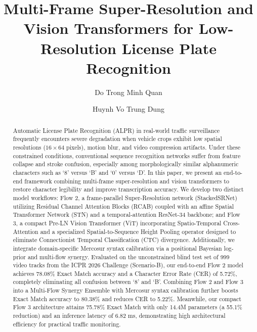 \documentclass[sigconf]{acmart}
\begin{document}
\title{Multi-Frame Super-Resolution and Vision Transformers for Low-Resolution License Plate Recognition}

\author{Do Trong Minh Quan}

\author{Huynh Vo Trung Dung}

\renewcommand{\shortauthors}{Quan and Dung}

\begin{abstract}
Automatic License Plate Recognition (ALPR) in real-world traffic surveillance frequently encounters severe degradation when vehicle crops exhibit low spatial resolutions ($16 \times 64$ pixels), motion blur, and video compression artifacts. Under these constrained conditions, conventional sequence recognition networks suffer from feature collapse and stroke confusion, especially among morphologically similar alphanumeric characters such as `8' versus `B' and `0' versus `D'. In this paper, we present an end-to-end framework combining multi-frame super-resolution and vision transformers to restore character legibility and improve transcription accuracy. We develop two distinct model workflows: Flow 2, a frame-parallel Super-Resolution network (StackedSRNet) utilizing Residual Channel Attention Blocks (RCAB) coupled with an affine Spatial Transformer Network (STN) and a temporal-attention ResNet-34 backbone; and Flow 3, a compact Pre-LN Vision Transformer (ViT) incorporating Spatio-Temporal Cross-Attention and a specialized Spatial-to-Sequence Height Pooling operator designed to eliminate Connectionist Temporal Classification (CTC) divergence. Additionally, we integrate domain-specific Mercosur syntax calibration via a positional Bayesian log-prior and multi-flow synergy. Evaluated on the unconstrained blind test set of 999 video tracks from the ICPR 2026 Challenge (Scenario-B), our end-to-end Flow 2 model achieves 78.08\% Exact Match accuracy and a Character Error Rate (CER) of 5.72\%, completely eliminating all confusion between `8' and `B'. Combining Flow 2 and Flow 3 into a Multi-Flow Synergy Ensemble with Mercosur syntax calibration further boosts Exact Match accuracy to 80.38\% and reduces CER to 5.22\%. Meanwhile, our compact Flow 3 architecture attains 75.78\% Exact Match with only 14.4M parameters (a 55.1\% reduction) and an inference latency of 6.82 ms, demonstrating high architectural efficiency for practical traffic monitoring.
\end{abstract}
\end{document}
